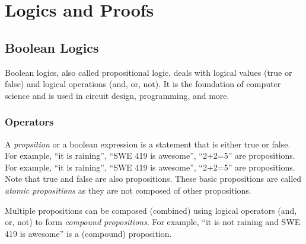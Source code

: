 \documentclass[oneside,11pt,dvipsnames]{book}
\begin{document}
\begin{itemize}

\end{itemize}

\chapter{Logics and Proofs}\label{chap:logics}

\section{Boolean Logics}

Boolean logics, also called propositional logic, deals with logical values (true or false) and logical operations (and, or, not). It is the foundation of computer science and is used in circuit design, programming, and more. 

\subsection{Operators}

A \emph{propsition} or a boolean expression is a statement that is either true or false. For example, ``it is raining'', ``SWE 419 is awesome'', ``2+2=5'' are propositions. For example, ``it is raining'', ``SWE 419 is awesome'', ``2+2=5'' are propositions. Note that true and false are also propositions.  These basic propositions are called \emph{atomic propositions} as they are not composed of other propositions.

Multiple propositions can be composed (combined) using logical operators (and, or, not) to form \emph{compound propositions}. For example, ``it is not raining and SWE 419 is awesome'' is a (compound) proposition. 
\end{document}
